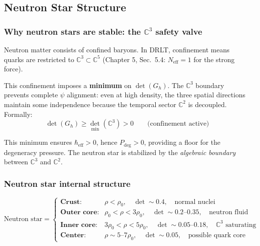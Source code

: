 \documentclass[12pt]{article}
\theoremstyle{remark}
\theoremstyle{definition}
\newcommand{\CC}{\mathbb{C}}
\begin{document}
\subsection{Neutron Star Structure}

\subsubsection{Why neutron stars are stable: the $\CC^3$ safety valve}

Neutron matter consists of confined baryons. In DRLT, confinement means quarks are restricted to $\CC^3 \subset \CC^5$ (Chapter 5, Sec.~5.4: $N_\text{eff} = 1$ for the strong force).

This confinement imposes a \textbf{minimum} on $\det(G_h)$. The $\CC^3$ boundary prevents complete $\psi$ alignment: even at high density, the three spatial directions maintain some independence because the temporal sector $\CC^2$ is decoupled. Formally:
\begin{equation}
\det(G_h) \geq \det_\text{min}(\CC^3) > 0 \qquad \text{(confinement active)}
\end{equation}

This minimum ensures $\hbar_\text{eff} > 0$, hence $P_\text{deg} > 0$, providing a floor for the degeneracy pressure. The neutron star is stabilized by the \emph{algebraic boundary} between $\CC^3$ and $\CC^2$.

\subsubsection{Neutron star internal structure}

\begin{equation}
\text{Neutron star} = \begin{cases}
\textbf{Crust:} & \rho < \rho_0, \quad \det \sim 0.4, \quad \text{normal nuclei} \\
\textbf{Outer core:} & \rho_0 < \rho < 3\rho_0, \quad \det \sim 0.2\text{--}0.35, \quad \text{neutron fluid} \\
\textbf{Inner core:} & 3\rho_0 < \rho < 5\rho_0, \quad \det \sim 0.05\text{--}0.18, \quad \text{$\CC^3$ saturating} \\
\textbf{Center:} & \rho \sim 5\text{--}7\rho_0, \quad \det \sim 0.05, \quad \text{possible quark core}
\end{cases}
\end{equation}
\end{document}
